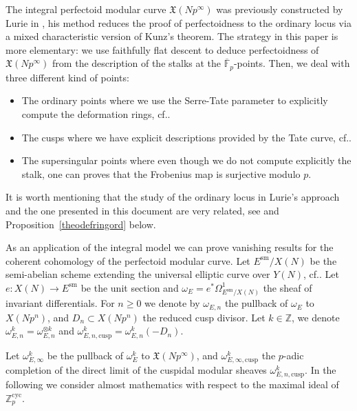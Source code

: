 \documentclass[11pt]{article}
\newcommand{\cf}{cf.\xspace}
\newcommand{\cusp}{\mathrm{cusp}}
\newcommand{\cyc}{\mathrm{cyc}}
\newcommand{\sm}{\mathrm{sm}}
\numberwithin{equation}{section}
\theoremstyle{definition}
\newcommand{\bb}[1]{\mathbb{#1}}
\newcommand{\f}[1]{\mathfrak{#1}}
\begin{document}
The integral perfectoid modular curve $\f{X}(Np^\infty)$ was previously constructed by Lurie in \cite{JacobFullLevel2019}, his method reduces the proof of perfectoidness to the ordinary locus via a mixed characteristic version of Kunz's theorem. The strategy in this paper is more elementary: we use faithfully flat descent to deduce perfectoidness of $\f{X}(Np^\infty)$ from the description of the stalks at the $\overline{\bb{F}}_p$-points. Then, we deal with three different kind of points:
\begin{itemize}
\item The ordinary points where we use the Serre-Tate parameter to explicitly compute the deformation rings, \cf \cite[\S 2]{katz1981serre}.
\item The cusps where we have explicit descriptions provided by the Tate curve, \cf \cite[\S 8--10]{katz1985arithmetic}.
\item The supersingular points where even though we do not compute explicitly the stalk, one can proves that the Frobenius map is surjective modulo $p$.
\end{itemize}
It is worth mentioning that the study of the ordinary locus in Lurie's approach and the one presented in this document are very related, see \cite[Prop.\,2.2]{JacobFullLevel2019} and Proposition~\ref{theodefringord} below.

As an application of the integral model we can prove vanishing results for the coherent cohomology of the perfectoid modular curve. Let $E^{\sm}/X(N)$ be the semi-abelian scheme extending the universal elliptic curve over $Y(N)$, \cf \cite{deligne1973schemas}. Let \hbox{$e: X(N)\to E^{\sm}$} be the unit section and $\omega_E= e^* \Omega^1_{E^{\sm}/X(N)}$ the sheaf of invariant differentials. For $n\geq 0$ we denote by $\omega_{E,n}$ the pullback of $\omega_E$ to $X(Np^n)$, and $D_n\subset X(Np^n)$ the reduced cusp divisor. Let $k\in \bb{Z}$, we denote $\omega^{k}_{E,n}= \omega^{\otimes k}_{E,n}$ and $\omega^{k}_{E,n,\cusp}= \omega^k_{E,n}(-D_n)$.

Let $\omega^k_{E,\infty}$ be the pullback of $\omega_E^k$ to $\f{X}(Np^\infty)$, and $\omega^k_{E,\infty, \cusp}$ the $p$-adic completion of the direct limit of the cuspidal modular sheaves $\omega^k_{E,n,\cusp}$. In the following we consider almost mathematics with respect to the maximal ideal of $\bb{Z}_p^{\cyc}$.
\end{document}
